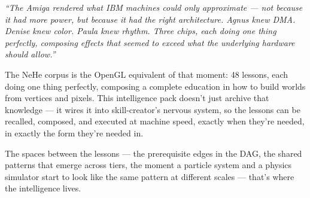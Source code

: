 \documentclass[11pt,letterpaper]{article}
\begin{document}
\begin{quotebox}
\textit{``The Amiga rendered what IBM machines could only approximate --- not because it had more power, but because it had the right architecture. Agnus knew DMA. Denise knew color. Paula knew rhythm. Three chips, each doing one thing perfectly, composing effects that seemed to exceed what the underlying hardware should allow.''}

\smallskip

The NeHe corpus is the OpenGL equivalent of that moment: 48 lessons, each doing one thing perfectly, composing a complete education in how to build worlds from vertices and pixels. This intelligence pack doesn't just archive that knowledge --- it wires it into skill-creator's nervous system, so the lessons can be recalled, composed, and executed at machine speed, exactly when they're needed, in exactly the form they're needed in.

\smallskip

The spaces between the lessons --- the prerequisite edges in the DAG, the shared patterns that emerge across tiers, the moment a particle system and a physics simulator start to look like the same pattern at different scales --- that's where the intelligence lives.
\end{quotebox}
\end{document}
